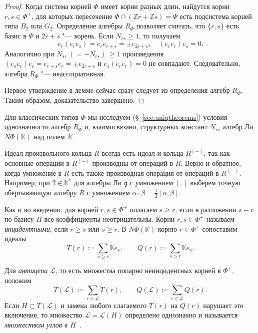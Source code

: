 \documentclass[a4paper,14pt,oneside,openany]{memoir}
\begin{document}
\begin{proof}
    Когда система корней $\Phi$ имеет корни разных длин, найдутся корни $r, s \in
    \Phi^+$, для которых пересечение $\Phi\cap (\mathbb{Z}r+ \mathbb{Z}s)=\Psi$
    есть подсистема корней типа $B_2$ или $G_2$. Определение алгебры $R_{\Phi}$
    позволяет считать, что $\{r, s \}$ есть базис в $\Psi$ и $2r+s$ "--- корень.
    Если $N_{rs} \geq 1$, то получаем
    \[
        e_r(e_re_s) =e_re_{r+s} = \pm e_{2r+s},\quad (e_re_r)e_s=0.
    \]
    Аналогично при $N_{sr}\ (=- N_{rs})\ \geq 1$ произведения $(e_se_r)e_r =e_{r+s}
    e_r = \pm e_{2r+s}$ и $e_s(e_re_r)=0$ не совпадают. Следовательно, алгебра
    $R_{\Phi}$ "--- неассоциативная.

    \medskip

    Первое утверждение в лемме сейчас сразу следует из определения алгебр
    $R_{\Phi}$. Таким образом, доказательство завершено.
\end{proof}

Для классических типов $\Phi$ мы исследуем (\S~\ref{sec:uniqtheorems}) условия
однозначности алгебр $R_{\Phi}$ и, взаимосвязано, структурных констант $N_{rs}$
алгебр Ли $N\Phi(\mathbb{K})$ над полем~$\mathbb{K}$.

\medskip

Идеал произвольного кольца $R$ всегда есть идеал и кольца $R^{(-)}$, так как
основные операции в $R^{(-)}$ производны от операций в $R$. Верно и обратное,
когда умножение в $R$ есть также производная операция от операций в $R^{(-)}$.
Например, при $2\in\mathbb{K}^*$ для алгебры Ли $\mathfrak{g}$ с умножением
$[,]$ выберем точную обертывающую алгебру $R$ с умножением $\alpha \cdot \beta
= \frac{1}{2}[\alpha, \beta]$.

\medskip

Как и во введении, для корней $r,s\in\Phi^+$ полагаем $s\geq r$, если в
разложении $s-r$ по базису $\Pi$ все коэффициенты неотрицательны. Корни
$r,s\in\Phi^+$ называем \emph{инцидентными}, если $r\geq s$ или $s\geq r$. В
$N\Phi(\mathbb{K})$ корню $r\in\Phi^+$ сопоставим идеалы
\[
    T(r)\coloneq\sum_{s\geq r}\mathbb{K}e_s,\qquad
    Q(r)\coloneq\sum_{s>r}\mathbb{K}e_s.
\]

Для \emph{антицепи} $\mathcal{L}$, то есть множества попарно неинцидентных
корней в $\Phi^+$, положим
\[
    T(\mathcal{L})\coloneq\sum_{r\in\mathcal{L}}T(r),\qquad
    Q(\mathcal{L})\coloneq\sum_{r\in\mathcal{L}}Q(r).
\]
Если $H\subset T(\mathcal{L})$ и замена любого слагаемого $T(r)$ на $Q(r)$
нарушает это включение, то множество $\mathcal{L}=\mathcal{L}(H)$ определено
однозначно и называется \emph{множеством углов в $H$}~\cite[\S~6]{Lev1992}.
\end{document}
